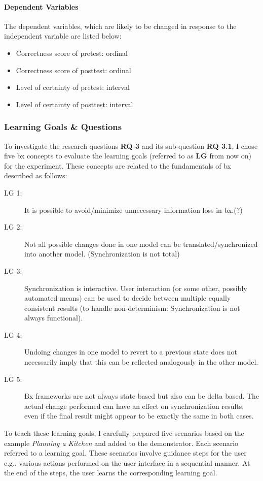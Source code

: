 \paragraph{Dependent Variables} The dependent variables, which are likely to be changed in response to the independent variable are listed below:

\begin{itemize}
	\item Correctness score of pretest: ordinal
	\item Correctness score of posttest: ordinal
	\item Level of certainty of pretest:  interval
	\item Level of certainty of posttest: interval
\end{itemize}

\subsubsection{Learning Goals \& Questions}\label{subsubsec:questions}
To investigate the research questions \textbf{RQ 3} and its sub-question \textbf{RQ 3.1}, I chose five bx concepts to evaluate the learning goals (referred to as \textbf{LG} from now on) for the experiment. These concepts are related to the fundamentals of bx described as follows:
\begin{description}
	\item[LG 1:] It is possible to avoid/minimize unnecessary information loss in bx.(?)
	\item[LG 2:] Not all possible changes done in one model can be translated/synchronized into another model. (Synchronization is not total)
	\item[LG 3:] Synchronization is interactive. User interaction (or some other, possibly automated means) can be used to decide between multiple equally consistent results (to handle non-determinism: Synchronization is not always functional). 
	\item[LG 4:] Undoing changes in one model to revert to a previous state does not necessarily imply that this can be reflected analogously in the other model. 
	\item[LG 5:] Bx frameworks are not always state based but also can be delta based. The actual change performed can have an effect on synchronization results, even if the final result might appear to be exactly the same in both cases. 
\end{description}

To teach these learning goals, I carefully prepared five scenarios based on the example \textit{Planning a Kitchen} and added to the demonstrator. Each scenario referred to a learning goal. These scenarios involve guidance steps for the user e.g., various actions performed on the user interface in a sequential manner. At the end of the steps, the user learns the corresponding learning goal.

